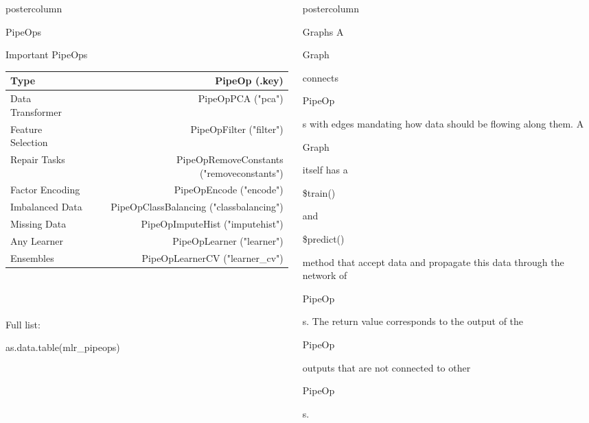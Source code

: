 \documentclass{beamer}
\newlength{\columnheight} %
\newcommand{\codeinline}[1]{\begin{codeboxinline}#1\end{codeboxinline}}
\begin{document}
\begin{frame}[fragile]{}
\begin{columns}
\begin{column}{.245\textwidth}
\begin{beamercolorbox}[center]{postercolumn}
\begin{minipage}{.98\textwidth}
{\begin{myblock}{PipeOps}
\begin{itemize}
              \end{itemize}
  			\end{myblock}
            \begin{myblock}{Important PipeOps}
              \begin{footnotesize}
                \begin{centering}
                  \begin{tabular}{l c r}
                    \textbf{Type} & & \textbf{PipeOp (.key)} \\ \hline
                    Data Transformer & & PipeOpPCA ("pca")\\
                    Feature Selection & & PipeOpFilter ("filter")\\
                    Repair Tasks & & PipeOpRemoveConstants ("removeconstants")\\
                    Factor Encoding & & PipeOpEncode ("encode")\\
                    Imbalanced Data & & PipeOpClassBalancing ("classbalancing")\\
                    Missing Data & & PipeOpImputeHist ("imputehist")\\
                    Any Learner & & PipeOpLearner ("learner")\\
                    Ensembles & & PipeOpLearnerCV ("learner\_cv")\\ \hline
                  \end{tabular}
                \end{centering}
              \end{footnotesize}
              \ \\
              \ \\
              \ \\
              Full list: \codeinline{as.data.table(mlr\_pipeops)}
						\end{myblock}
						\vfill}
				\end{minipage}
			\end{beamercolorbox}
		\end{column}
		\begin{column}{.245\textwidth}
			\begin{beamercolorbox}[center]{postercolumn}
				\begin{minipage}{.98\textwidth}
					\parbox[t][\columnheight]{\textwidth}{
						\begin{myblock}{Graphs}
              A \codeinline{Graph} connects \codeinline{PipeOp}s with edges mandating how data should be flowing along them. A \codeinline{Graph} itself has a \codeinline{\$train()} and \codeinline{\$predict()} method that accept data and propagate this data through the network of \codeinline{PipeOp}s. The return value corresponds to the output of the \codeinline{PipeOp} outputs that are not connected to other \codeinline{PipeOp}s.\\

\end{myblock}}
\end{minipage}
\end{beamercolorbox}
\end{column}
\end{columns}
\end{frame}
\end{document}
